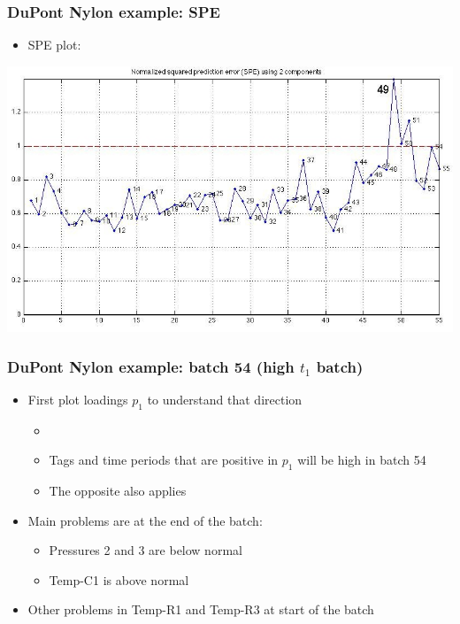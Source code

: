 \begin{frame}\frametitle{DuPont Nylon example: SPE}
	\begin{itemize}
		\item	SPE plot: {} 
	\end{itemize}
	
	\begin{center}
		\includegraphics[width=\textwidth]{images/dupont/dupont-raw-SPE.jpg}
	\end{center}
\end{frame}

\begin{frame}\frametitle{DuPont Nylon example: batch 54 (high \( t_1 \) batch)}
	\begin{itemize}
		\item	First plot loadings \( p_1 \) to understand that direction
			
				\begin{itemize}
					\item	{} 
					
					\item	Tags and time periods that are positive in \( p_1 \) will be high in batch 54
					
					\item	The opposite also applies
				\end{itemize}
		
		\item 	Main problems are at the end of the batch:
		
				\begin{itemize}
					\item	Pressures 2 and 3 are below normal
					
					\item	Temp-C1 is above normal
					
				\end{itemize}
		
		\item 	Other problems in Temp-R1 and Temp-R3 at start of the batch
	\end{itemize}
\end{frame}

